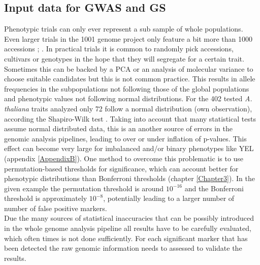 \subsection{Input data for GWAS and GS}

Phenotypic trials can only ever represent a sub sample of whole populations. Even larger
trials in the 1001 genome project only feature a bit more than 1000 accessions
\cite{atwell2010}; \cite{1001genome}. In practical trials it is common to randomly pick
accessions, cultivars or genotypes in the hope that they will segregate for a certain
trait. Sometimes this can be backed by a PCA or an analysis of molecular variance to
choose suitable candidates \cite{holker2019european} but this is not common practice. This
results in allele frequencies in the subpopulations not following those of the global
populations and phenotypic values not following normal distributions. For the 402 tested
\textit{A. thaliana} traits analyzed only 72 follow a normal distribution (own
observation), according the Shapiro-Wilk test \cite{shapiro1965analysis}. Taking into
account that many statistical tests assume normal distributed data, this is an another
source of errors in the genomic analysis pipelines, leading to over or under inflation of
p-values. This effect can become very large for imbalanced and/or binary phenotypes like
YEL (appendix \ref{AppendixB}). One method to overcome this problematic is to use
permutation-based thresholds for significance, which can account better for phenotypic
distributions than Bonferroni thresholds (chapter \ref{Chapter3}). In the given example
the permutation threshold is around $10^{-16}$ and the Bonferroni threshold is
approximately $10^{-8 }$, potentially leading to a larger number of number of false
positive markers.\\
Due the many sources of statistical inaccuracies that can be possibly introduced in the
whole genome analysis pipeline all results have to be carefully evaluated, which often
times is not done sufficiently. For each significant marker that has been detected the raw
genomic information needs to assessed to validate the results. 


